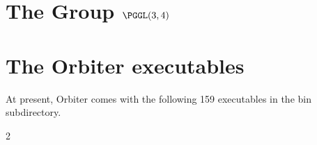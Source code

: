 
\begin{appendix}










\section{The Group $\PGGL(3,4)$}
\label{appendix:reportPGGL34}






















\section{The Orbiter executables}
\label{app:executables}

At present, Orbiter comes with the following 159 executables in the bin subdirectory.


\begin{multicols}{2}
{\tt 

}
\end{multicols}






\end{appendix}

